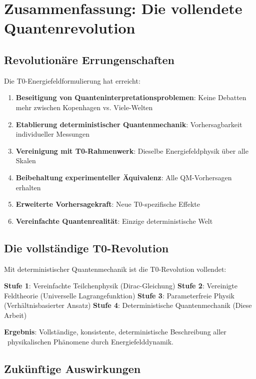 \documentclass[12pt,a4paper]{article}
\begin{document}
			\section{Zusammenfassung: Die vollendete Quantenrevolution}
			
			\subsection{Revolutionäre Errungenschaften}
			
			Die T0-Energiefeldformulierung hat erreicht:
			
			\begin{enumerate}
				\item \textbf{Beseitigung von Quanteninterpretationsproblemen}: Keine Debatten mehr zwischen Kopenhagen vs. Viele-Welten
				\item \textbf{Etablierung deterministischer Quantenmechanik}: Vorhersagbarkeit individueller Messungen
				\item \textbf{Vereinigung mit T0-Rahmenwerk}: Dieselbe Energiefeldphysik über alle Skalen
				\item \textbf{Beibehaltung experimenteller Äquivalenz}: Alle QM-Vorhersagen erhalten
				\item \textbf{Erweiterte Vorhersagekraft}: Neue T0-spezifische Effekte
				\item \textbf{Vereinfachte Quantenrealität}: Einzige deterministische Welt
			\end{enumerate}
			
			\subsection{Die vollständige T0-Revolution}
			
			Mit deterministischer Quantenmechanik ist die T0-Revolution vollendet:
			
			\textbf{Stufe 1}: Vereinfachte Teilchenphysik (Dirac-Gleichung)
			\textbf{Stufe 2}: Vereinigte Feldtheorie (Universelle Lagrangefunktion)
			\textbf{Stufe 3}: Parameterfreie Physik (Verhältnisbasierter Ansatz)
			\textbf{Stufe 4}: Deterministische Quantenmechanik (Diese Arbeit)
			
			\textbf{Ergebnis}: Vollständige, konsistente, deterministische Beschreibung aller \
			physikalischen Phänomene durch Energiefelddynamik.
			
			\subsection{Zukünftige Auswirkungen}
			
\end{document}
